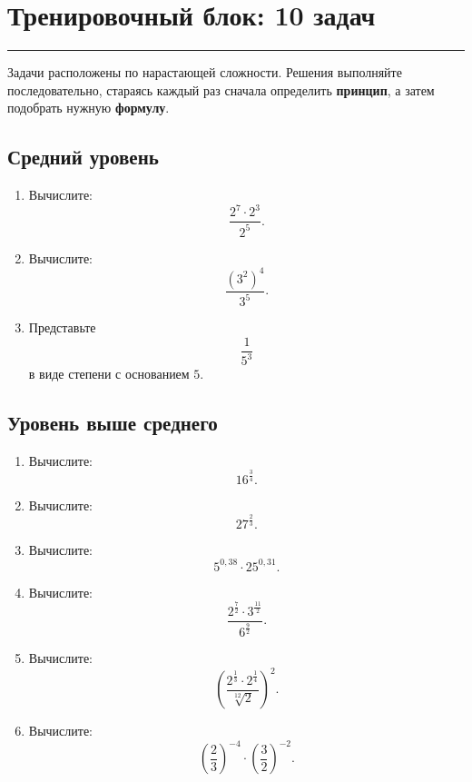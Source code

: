 \documentclass[a4paper,12pt]{article}
\newcommand{\lessonrule}{%
  \par\vspace{0.3em}
  {\color{accent}\rule{\linewidth}{0.6pt}}
  \vspace{0.5em}
}
\newcommand{\important}[1]{\textbf{\color{darkaccent}#1}}
\begin{document}
\clearpage

\section*{\color{darkaccent}Тренировочный блок: 10 задач}
\lessonrule

Задачи расположены по нарастающей сложности.
Решения выполняйте последовательно, стараясь каждый раз сначала определить
\important{принцип}, а затем подобрать нужную \important{формулу}.

\subsection*{\color{accent}Средний уровень}

\begin{enumerate}[label=\textbf{\arabic*.}]

\item Вычислите:
\[
\frac{2^7\cdot2^3}{2^5}.
\]

\item Вычислите:
\[
\frac{(3^2)^4}{3^5}.
\]

\item Представьте
\[
\frac1{5^3}
\]
в виде степени с основанием \(5\).

\end{enumerate}

\subsection*{\color{accent}Уровень выше среднего}

\begin{enumerate}[label=\textbf{\arabic*.},start=4]

\item Вычислите:
\[
16^{\frac34}.
\]

\item Вычислите:
\[
27^{\frac23}.
\]

\item Вычислите:
\[
5^{0,38}\cdot25^{0,31}.
\]

\item Вычислите:
\[
\frac{
2^{\frac72}\cdot3^{\frac{11}{2}}
}{
6^{\frac92}
}.
\]

\item Вычислите:
\[
\left(
\frac{
2^{\frac13}\cdot2^{\frac14}
}{
\sqrt[12]{2}
}
\right)^2.
\]

\item Вычислите:
\[
\left(\frac23\right)^{-4}
\cdot
\left(\frac32\right)^{-2}.
\]

\end{enumerate}
\end{document}
